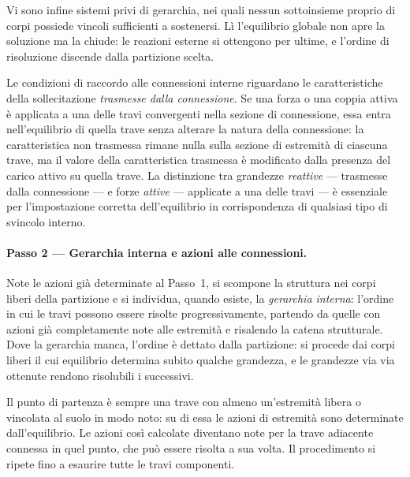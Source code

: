 Vi sono infine sistemi privi di gerarchia, nei quali nessun
sottoinsieme proprio di corpi possiede vincoli sufficienti a
sostenersi. Lì l'equilibrio globale non apre la soluzione ma
la chiude: le reazioni esterne si ottengono per ultime, e
l'ordine di risoluzione discende dalla partizione scelta.

\begin{oss}
	Le condizioni di raccordo alle connessioni
	interne riguardano le caratteristiche della
	sollecitazione \emph{trasmesse dalla
		connessione}. Se una forza o una coppia
	attiva è applicata a una delle travi
	convergenti nella sezione di connessione,
	essa entra nell'equilibrio di quella trave
	senza alterare la natura della connessione:
	la caratteristica non trasmessa rimane nulla
	sulla sezione di estremità di ciascuna trave,
	ma il valore della caratteristica trasmessa
	è modificato dalla presenza del carico attivo
	su quella trave. La distinzione tra grandezze
	\emph{reattive} --- trasmesse dalla connessione
	--- e forze \emph{attive} --- applicate a una
	delle travi --- è essenziale per l'impostazione
	corretta dell'equilibrio in corrispondenza
	di qualsiasi tipo di svincolo interno.
\end{oss}

\paragraph{Passo 2 --- Gerarchia interna e azioni
	alle connessioni.}

Note le azioni già determinate al Passo~1, si scompone
la struttura nei corpi liberi della partizione e si
individua, quando esiste, la \emph{gerarchia
interna}: l'ordine in cui le
travi possono essere risolte progressivamente,
partendo da quelle con azioni già completamente
note alle estremità e risalendo la catena
strutturale. Dove la gerarchia manca, l'ordine è
dettato dalla partizione: si procede dai corpi liberi
il cui equilibrio determina subito qualche grandezza,
e le grandezze via via ottenute rendono risolubili i
successivi.

Il punto di partenza è sempre una trave con
almeno un'estremità libera o vincolata al suolo
in modo noto: su di essa le azioni di estremità
sono determinate dall'equilibrio. Le azioni
così calcolate diventano note per la trave
adiacente connessa in quel punto, che può
essere risolta a sua volta. Il procedimento
si ripete fino a esaurire tutte le travi
componenti.

